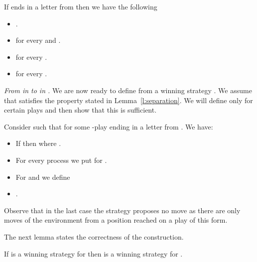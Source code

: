 \documentclass{llncs}
\begin{document}
\medskip

\begin{lemma}\label{lemma:states}
  If  ends in a letter from  then we have the following
  \begin{itemize}
  \item .
  \item  for every  and
    .
  \item  for every .
  \item  for every .
  \end{itemize}
\end{lemma}


\medskip
\noindent\textit{From  in  to  in .}
We are now ready to define  from a winning strategy . We
assume that  satisfies the property stated in
Lemma~\ref{l:separation}. We will define  only for certain plays and
then show that this is sufficient. 

Consider  such that  for some -play  ending in
a letter from . We have:
\begin{itemize}
\item If  then 
  where .
\item For every process  we put
   for .
\item For  and  we define
  
\item .
\end{itemize}
Observe that in the last case the strategy proposes no move as there
are only moves of the environment from a position reached on a play of
this form.

The next lemma states the correctness of the construction. 



 \begin{lemma}\label{lemma:sigma to sigma prim}
  If  is a winning strategy for  then 
  is a winning strategy for .
\end{lemma}
\end{document}
